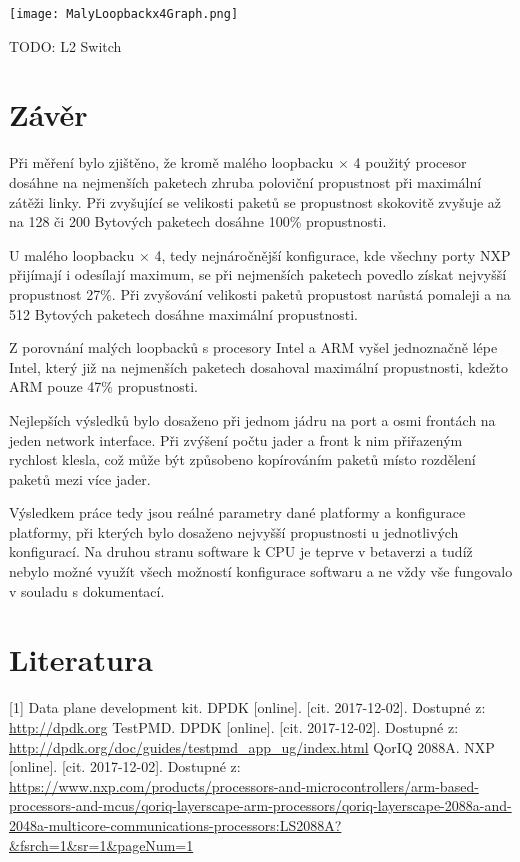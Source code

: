 \documentclass[11pt, titlepage, a4paper]{article}
\begin{document}
		\begin{center}
		\texttt{[image: MalyLoopbackx4Graph.png]}
		\end{center}

		TODO: L2 Switch

		


		\newpage
		\section{Závěr}

		Při měření bylo zjištěno, že kromě malého loopbacku $\times$ 4 použitý procesor dosáhne na nejmenších paketech zhruba poloviční propustnost při maximální zátěži linky.
		Při zvyšující se velikosti paketů se propustnost skokovitě zvyšuje až na 128 či 200 Bytových paketech dosáhne 100\% propustnosti.

		U malého loopbacku $\times$ 4, tedy nejnáročnější konfigurace, kde všechny porty NXP přijímají i odesílají maximum, se při nejmenších paketech povedlo získat nejvyšší propustnost 27\%.
		Při zvyšování velikosti paketů propustost narůstá pomaleji a na 512 Bytových paketech dosáhne maximální propustnosti.

		Z porovnání malých loopbacků s procesory Intel a ARM vyšel jednoznačně lépe Intel, který již na nejmenších paketech dosahoval maximální propustnosti, kdežto ARM pouze 47\%
		propustnosti.

		Nejlepších výsledků bylo dosaženo při jednom jádru na port a osmi frontách na jeden network interface. Při zvýšení počtu jader a front k nim přiřazeným rychlost
		klesla, což může být způsobeno kopírováním paketů místo rozdělení paketů mezi více jader.

		Výsledkem práce tedy jsou reálné parametry dané platformy a konfigurace platformy, při kterých bylo dosaženo nejvyšší propustnosti u jednotlivých konfigurací.
		Na druhou stranu software k CPU je teprve v betaverzi a tudíž nebylo možné využít všech možností konfigurace softwaru a ne vždy vše fungovalo v souladu s dokumentací.


		\section*{Literatura}
		
		[1] Data plane development kit. DPDK [online]. [cit. 2017-12-02]. Dostupné z:
		      \url{http://dpdk.org}
		\newline
		[2] TestPMD. DPDK [online]. [cit. 2017-12-02]. Dostupné z:
		      \url{http://dpdk.org/doc/guides/testpmd_app_ug/index.html}
		\newline
		[3] QorIQ 2088A. NXP [online]. [cit. 2017-12-02]. Dostupné z:
                           \url{https://www.nxp.com/products/processors-and-microcontrollers/arm-based-processors-and-mcus/qoriq-layerscape-arm-processors/qoriq-layerscape-2088a-and-2048a-multicore-communications-processors:LS2088A?&fsrch=1&sr=1&pageNum=1}
\end{document}
